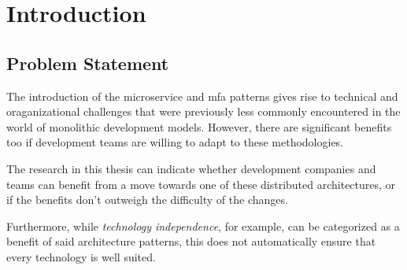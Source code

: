 
\chapter{Introduction}
\label{ch:introduction}





\section{Problem Statement}
\label{sec:problem-statement}


The introduction of the \gls{microservice} and \gls{mfa} patterns gives rise to
technical and oraganizational challenges that were previously less commonly
encountered in the world of \gls{monolithic} development models. However, there
are significant benefits too if development teams are willing to adapt to these
methodologies. 

The research in this thesis can indicate whether development companies and teams
can benefit from a move towards one of these distributed architectures, or if
the benefits don't outweigh the difficulty of the changes.

Furthermore, while \textit{technology independence}, for example, can be
categorized as a benefit of said architecture patterns, this does not
automatically ensure that every technology is well suited. 

